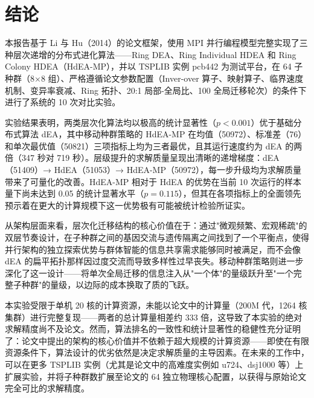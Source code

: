 \section{结论}

本报告基于 Li 与 Hu（2014）的论文框架，使用 MPI 并行编程模型完整实现了三种层次递增的分布式进化算法——Ring DEA、Ring Individual HDEA 和 Ring Colony HDEA（HdEA-MP），并以 TSPLIB 实例 pcb442 为测试平台，在 64 子种群（8×8 组）、严格遵循论文参数配置（Inver-over 算子、映射算子、临界速度机制、变异率衰减、Ring 拓扑、20:1 局部-全局比、100 全局迁移轮次）的条件下进行了系统的 10 次对比实验。

实验结果表明，两类层次化算法均以极高的统计显著性（$p<0.001$）优于基础分布式算法 dEA，其中移动种群策略的 HdEA-MP 在均值（50972）、标准差（76）和单次最优值（50821）三项指标上均为三者最优，且其运行速度约为 dEA 的两倍（347 秒对 719 秒）。层级提升的求解质量呈现出清晰的递增梯度：dEA（51409）→ HdEA（51053）→ HdEA-MP（50972），每一步升级均为求解质量带来了可量化的改善。HdEA-MP 相对于 HdEA 的优势在当前 10 次运行的样本量下尚未达到 0.05 的统计显著水平（$p=0.115$），但其在各项指标上的全面领先预示着在更大的计算规模下这一优势极有可能被统计检验所证实。

从架构层面来看，层次化迁移结构的核心价值在于：通过"微观频繁、宏观稀疏"的双层节奏设计，在子种群之间的基因交流与遗传隔离之间找到了一个平衡点，使得并行架构的独立探索优势与群体智能的信息共享需求能够同时被满足，而不会像 dEA 的扁平拓扑那样因过度交流而导致多样性过早丧失。移动种群策略则进一步深化了这一设计——将单次全局迁移的信息注入从"一个体"的量级跃升至"一个完整子种群"的量级，以边际的成本换取了质的飞跃。

本实验受限于单机 20 核的计算资源，未能以论文中的计算量（200M 代，1264 核集群）进行完整复现——两者的总计算量相差约 333 倍，这导致了本实验的绝对求解精度尚不及论文。然而，算法排名的一致性和统计显著性的稳健性充分证明了：论文中提出的架构的核心价值并不依赖于超大规模的计算资源——即使在有限资源条件下，算法设计的优劣依然是决定求解质量的主导因素。在未来的工作中，可以在更多 TSPLIB 实例（尤其是论文中的高难度实例如 u724、dsj1000 等）上扩展实验，并将子种群数扩展至论文的 64 独立物理核心配置，以获得与原始论文完全可比的求解精度。
